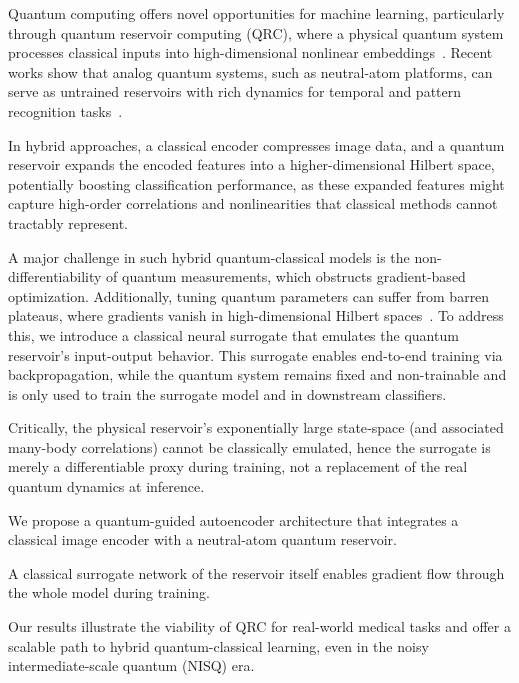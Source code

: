 \documentclass[conference]{IEEEtran}
\begin{document}
Quantum computing offers novel opportunities for machine learning, particularly through quantum reservoir computing (QRC), where a physical quantum system processes classical inputs into high-dimensional nonlinear embeddings~\cite{tanakaRecentAdvancesPhysical2019,fujiiHarnessingDisorderedQuantum2017}. Recent works show that analog quantum systems, such as neutral-atom platforms, can serve as untrained reservoirs with rich dynamics for temporal and pattern recognition tasks~\cite{domingoOptimalQuantumReservoir2022,kornjavcaLargescaleQuantumReservoir2024}. 

In hybrid approaches, a classical encoder compresses image data, and a quantum reservoir expands the encoded features into a higher-dimensional Hilbert space, potentially boosting classification performance, as these expanded features might capture high-order correlations and nonlinearities that classical methods cannot tractably represent.

A major challenge in such hybrid quantum-classical models is the non-differentiability of quantum measurements, which obstructs gradient-based optimization. Additionally, tuning quantum parameters can suffer from barren plateaus, where gradients vanish in high-dimensional Hilbert spaces~\cite{mccleanBarrenPlateausQuantum2018}. To address this, we introduce a classical neural surrogate that emulates the quantum reservoir's input-output behavior. This surrogate enables end-to-end training via backpropagation, while the quantum system remains fixed and non-trainable and is only used to train the surrogate model and in downstream classifiers.

Critically, the physical reservoir’s exponentially large state‐space (and associated many-body correlations) cannot be classically emulated, hence the surrogate is merely a differentiable proxy during training, not a replacement of the real quantum dynamics at inference.

We propose a quantum-guided autoencoder architecture that integrates a classical image encoder with a neutral-atom quantum reservoir.

A classical surrogate network of the reservoir itself enables gradient flow through the whole model during training.

Our results illustrate the viability of QRC for real-world medical tasks and offer a scalable path to hybrid quantum-classical learning, even in the noisy intermediate-scale quantum (NISQ) era.
\end{document}
